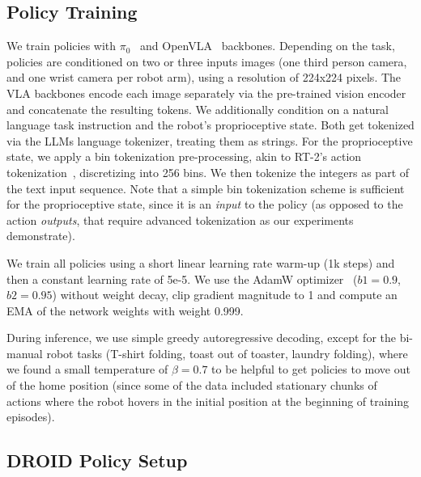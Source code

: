 \subsection{Policy Training}
\label{sec:app_policy_training_details}

We train policies with $\pi_0$~\citep{black2024pi_0} and OpenVLA~\citep{kim2024openvla} backbones. Depending on the task, policies are conditioned on two or three inputs images (one third person camera, and one wrist camera per robot arm), using a resolution of 224x224 pixels. The VLA backbones encode each image separately via the pre-trained vision encoder and concatenate the resulting tokens. We additionally condition on a natural language task instruction and the robot's proprioceptive state. Both get tokenized via the LLMs language tokenizer, treating them as strings. For the proprioceptive state, we apply a bin tokenization pre-processing, akin to RT-2's action tokenization~\citep{rt22023arxiv}, discretizing into 256 bins. We then tokenize the integers as part of the text input sequence. Note that a simple bin tokenization scheme is sufficient for the proprioceptive state, since it is an \emph{input} to the policy (as opposed to the action \emph{outputs}, that require advanced tokenization as our experiments demonstrate).

We train all policies using a short linear learning rate warm-up (1k steps) and then a constant learning rate of 5e-5. We use the AdamW optimizer~\citep{loshchilov2017decoupled} ($b1 = 0.9$, $b2 = 0.95$) without weight decay, clip gradient magnitude to 1 and compute an EMA of the network weights with weight 0.999.

During inference, we use simple greedy autoregressive decoding, except for the bi-manual robot tasks (T-shirt folding, toast out of toaster, laundry folding), where we found a small temperature of $\beta = 0.7$ to be helpful to get policies to move out of the home position (since some of the data included stationary chunks of actions where the robot hovers in the initial position at the beginning of training episodes).

\subsection{DROID Policy Setup}
\label{sec:app_droid_exp_details}

